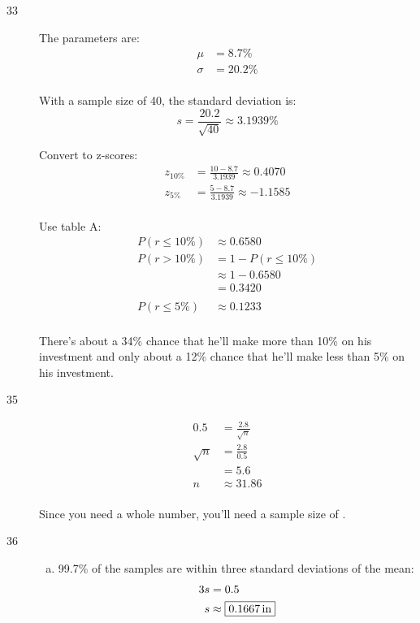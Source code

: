 \documentclass[letterpaper, landscape]{exam}
\begin{document}
\begin{description}
      \item[33]
        The parameters are:
        \begin{align*}
          \mu    & = 8.7\% \\
          \sigma & = 20.2\% \\
        \end{align*}

        With a sample size of 40, the standard deviation is:
        \[
          s = \frac{20.2}{\sqrt{40}} \approx 3.1939\%
        \]

        Convert to z-scores:
        \begin{align*}
          z_{10\%} & = \frac{10 - 8.7}{3.1939} \approx 0.4070 \\
          z_{5\%}  & = \frac{5 - 8.7}{3.1939} \approx -1.1585 \\
        \end{align*}

        Use table A:\@
        \begin{align*}
          P(r \leq 10\%) & \approx \boxed{ 0.6580 } \\
          P(r > 10\%)    & = 1 - P(r \leq 10\%) \\
                         & \approx 1 - 0.6580 \\
                         & = \boxed{ 0.3420 } \\
          \\
          P(r \leq 5\%)  & \approx \boxed{ 0.1233 } \\
        \end{align*}

        There's about a 34\% chance that he'll make more than 10\% on his
        investment and only about a 12\% chance that he'll make less than 5\% on
        his investment.

      \item[35]
        \begin{align*}
          0.5      & = \frac{2.8}{\sqrt{n}} \\
          \sqrt{n} & = \frac{2.8}{0.5} \\
                   & = 5.6 \\
          n        & \approx 31.86 \\
        \end{align*}

        Since you need a whole number, you'll need a sample size of 
        .

      \item[36]
        \begin{enumerate}[(a)]
          \item 99.7\% of the samples are within three standard deviations of the
            mean:
            \begin{align*}
              3s & = 0.5 \\
              s  & \approx \boxed{ \unit[0.1667]{in} } \\
            \end{align*}


\end{enumerate}
\end{description}
\end{document}
